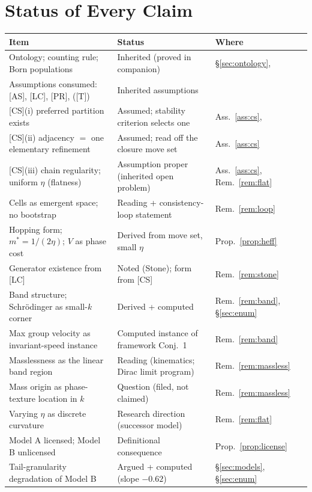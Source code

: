 \documentclass[11pt]{article}
\theoremstyle{definition}
\theoremstyle{remark}
\begin{document}
\section{Status of Every Claim}\label{sec:ledger}
\begin{center}\footnotesize
\begin{tabular}{@{}lll@{}}
\toprule
Item & Status & Where\\
\midrule
Ontology; counting rule; Born populations & Inherited (proved in companion) & \S\ref{sec:ontology}, \cite{TillittBorn}\\
Assumptions consumed: [AS], [LC], [PR], ([T]) & Inherited assumptions & \cite{TillittBorn}\\
{[CS]}(i) preferred partition exists & Assumed; stability criterion selects one & Ass.~\ref{ass:cs}, \cite{TillittBorn}\\
{[CS]}(ii) adjacency $=$ one elementary refinement & Assumed; read off the closure move set & Ass.~\ref{ass:cs}\\
{[CS]}(iii) chain regularity; uniform $\eta$ (flatness) & Assumption proper (inherited open problem) & Ass.~\ref{ass:cs}, Rem.~\ref{rem:flat}\\
Cells as emergent space; no bootstrap & Reading + consistency-loop statement & Rem.~\ref{rem:loop}\\
Hopping form; $m^\ast = 1/(2\eta)$; $V$ as phase cost & Derived from move set, small $\eta$ & Prop.~\ref{prop:heff}\\
Generator existence from [LC] & Noted (Stone); form from [CS] & Rem.~\ref{rem:stone}\\
Band structure; Schr\"odinger as small-$k$ corner & Derived + computed & Rem.~\ref{rem:band}, \S\ref{sec:enum}\\
Max group velocity as invariant-speed instance & Computed instance of framework Conj.~1 & Rem.~\ref{rem:band}\\
Masslessness as the linear band region & Reading (kinematics; Dirac limit program) & Rem.~\ref{rem:massless}\\
Mass origin as phase-texture location in $k$ & Question (filed, not claimed) & Rem.~\ref{rem:massless}\\
Varying $\eta$ as discrete curvature & Research direction (successor model) & Rem.~\ref{rem:flat}\\
Model A licensed; Model B unlicensed & Definitional consequence & Prop.~\ref{prop:license}\\
Tail-granularity degradation of Model B & Argued + computed (slope $-0.62$) & \S\ref{sec:models}, \S\ref{sec:enum}\\

\end{tabular}
\end{center}
\end{document}

